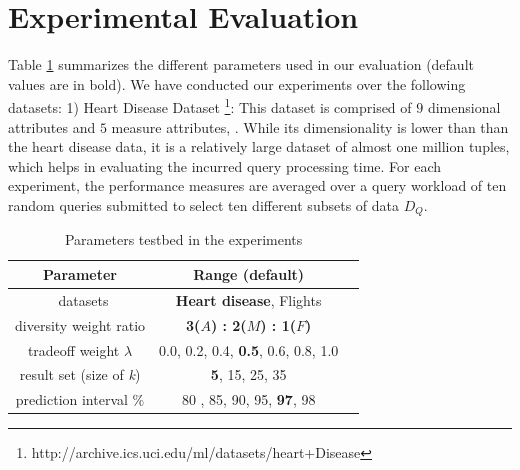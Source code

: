 
\section{Experimental Evaluation}\label{sec:experimental_testbed}

%
Table \ref{tab:tab-parameter} summarizes the different parameters used in our evaluation (default values are in bold).  
%
We have conducted our experiments over the following datasets: 1) Heart Disease Dataset \footnote{http://archive.ics.uci.edu/ml/datasets/heart+Disease}: This dataset is comprised of $9$ dimensional attributes and $5$ measure attributes, . While its dimensionality is lower than than the heart disease data, it is a relatively large dataset of almost one million tuples, which helps in evaluating the incurred query processing time.
%
For each experiment, the performance measures are averaged over a query workload of ten random queries submitted to select ten different subsets of data $D_Q$. 
%


\begin{table}[t]
	\caption{Parameters testbed in the experiments}
	\vspace{-10pt}
	\label{tab:tab-parameter}
	\begin{tabular}{ccl}
		\toprule
		Parameter &Range (\textbf{default})\\
		\midrule\
		datasets & \textbf{Heart disease}, Flights\\
		diversity weight ratio & \textbf{3($ A $) : 2($ M $) : 1($ F $)} \\
		tradeoff weight $ \lambda $ & 0.0, 0.2, 0.4, \textbf{0.5}, 0.6, 0.8, 1.0 \\
		result set (size of \textit{k}) & \textbf{5}, 15, 25, 35\\
		prediction interval \% & 80 , 85, 90, 95, \textbf{97}, 98\\
		\bottomrule
	\end{tabular}
		\vspace{1pt}
\end{table}



